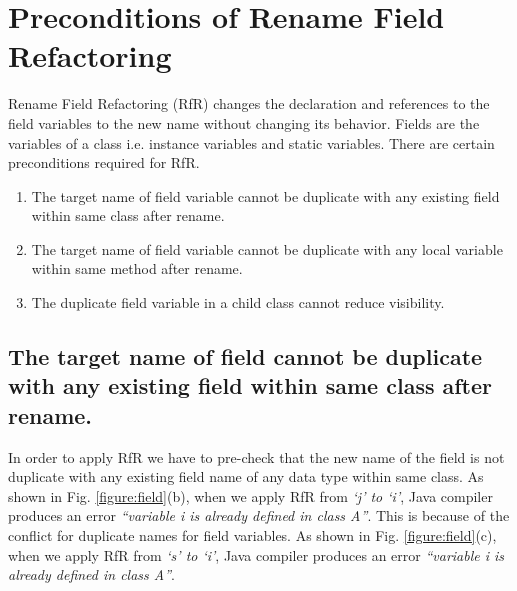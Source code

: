 \section{\textbf{Preconditions of Rename Field Refactoring}}
Rename Field Refactoring (RfR) changes the declaration and references to the field variables to the new name without changing its behavior.
Fields are the variables of a class i.e. instance variables and static variables.
There are certain preconditions required for RfR.

\begin{enumerate}
	\item The target name of field variable cannot be duplicate with any existing field within same class after rename.
	\item The target name of field variable cannot be duplicate with any local variable within same method after rename.
	\item The duplicate field variable in a child class cannot reduce visibility. 
\end{enumerate}

\subsection{The target name of field cannot be duplicate with any existing field within same class after rename.}

In order to apply RfR we have to pre-check that the new name of the field is not duplicate with any existing field name of any data type within same class. As shown in Fig. \ref{figure:field}(b), when we apply RfR from \emph{`j' to `i'}, Java compiler produces an error \textit{``variable i is already defined in class A''}. This is because of the conflict for duplicate names for field variables. As shown in Fig. \ref{figure:field}(c), when we apply RfR from \emph{`s' to `i'}, Java compiler produces an error \textit{``variable i is already defined in class A''}. 

